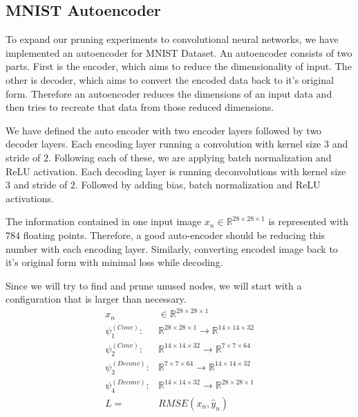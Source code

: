 \subsection{MNIST Autoencoder}
To expand our pruning experiments to convolutional neural networks, we have implemented an autoencoder for MNIST Dataset. An autoencoder consists of two parts. First is the encoder, which aims to reduce the dimensionality of input. The other is decoder, which aims to convert the encoded data back to it's original form. Therefore an autoencoder reduces the dimensions of an input data and then tries to recreate that data from those reduced dimensions.

We have defined the auto encoder with two encoder layers followed by two decoder layers. Each encoding layer running a convolution with kernel size $3$ and stride of $2$. Following each of these, we are applying batch normalization and ReLU activation. Each decoding layer is running deconvolutions with kernel size $3$ and stride of $2$. Followed by adding bias, batch normalization and ReLU activations.   

The information contained in one input image $x_n \in \mathbb{R}^{28 \times 28 \times 1}$ is represented with $784$ floating points. Therefore, a good auto-encoder should be reducing this number with each encoding layer. Similarly, converting encoded image back to it's original form with minimal loss while decoding. 

Since we will try to find and prune unused nodes, we will start with a configuration that is larger than necessary. 
\begin{equation*}
\begin{split}
x_n &\in \mathbb{R}^{28 \times 28 \times 1}\\
\psi_1^{(Conv)}:& \mathbb{R}^{28 \times 28 \times 1} \rightarrow \mathbb{R}^{14 \times 14 \times 32} \\
\psi_2^{(Conv)}:& \mathbb{R}^{14 \times 14 \times 32} \rightarrow \mathbb{R}^{7 \times 7 \times 64} \\
\psi_3^{(Deconv)}:& \mathbb{R}^{7 \times 7 \times 64} \rightarrow \mathbb{R}^{14 \times 14 \times 32} \\
\psi_4^{(Deconv)}:& \mathbb{R}^{14 \times 14 \times 32} \rightarrow \mathbb{R}^{28 \times 28 \times 1} \\
L =& RMSE(x_n, \hat y_n)
\end{split}
\end{equation*}

